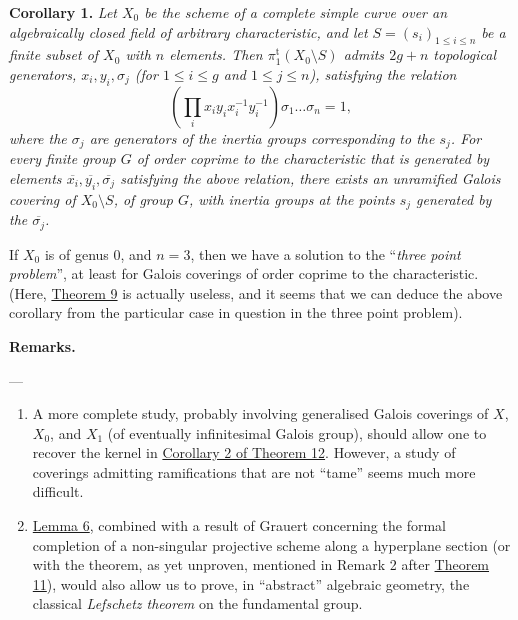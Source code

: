 \documentclass{article}
\newenvironment{itenv}[1]
  {\phantomsection\par\smallskip\noindent\textbf{#1.}\itshape}
  {\par\smallskip}
\newenvironment{rmenv}[1]
  {\phantomsection\par\smallskip\noindent\textbf{#1.}\rmfamily}
  {\par\smallskip}
\newcommand{\oldpage}[1]{\marginpar{\footnotesize$\Big\vert$ \textit{p.~#1}}}
\theoremstyle{definition}
\theoremstyle{definition}
\theoremstyle{definition}
\theoremstyle{definition}
\theoremstyle{remark}
\begin{document}
\leavevmode{}%
\begin{itenv}{Corollary 1}
Let \(X_0\) be the scheme of a complete simple curve over an algebraically closed field of arbitrary characteristic, and let \(S=(s_i)_{1\leqslant i\leqslant n}\) be a finite subset of \(X_0\) with \(n\) elements.
Then \(\pi_1^\mathrm{t}(X_0\setminus S)\) admits \(2g+n\) topological generators, \(x_i,y_i,\sigma_j\) (for \(1\leqslant i\leqslant g\) and \(1\leqslant j\leqslant n\)), satisfying the relation
\[
  \left(\prod_i x_iy_ix_i^{-1}y_i^{-1}\right)\sigma_1\ldots\sigma_n = 1,
\]
where the \(\sigma_j\) are generators of the inertia groups corresponding to the \(s_j\).
For every finite group \(G\) \emph{of order coprime to the characteristic} that is generated by elements \(\overline{x_i},\overline{y_i},\overline{\sigma_j}\) satisfying the above relation, there exists an unramified Galois covering of \(X_0\setminus S\), of group \(G\), with inertia groups at the points \(s_j\) generated by the \(\overline{\sigma_j}\).

\end{itenv}

If \(X_0\) is of genus \(0\), and \(n=3\), then we have a solution to the ``\emph{three point problem}'', at least for Galois coverings of order coprime to the characteristic.
\oldpage{182-28}(Here, \protect\hyperlink{fga-2-theorem-9}{Theorem 9} is actually useless, and it seems that we can deduce the above corollary from the particular case in question in the three point problem).

\begin{rmenv}{Remarks}

---

\begin{enumerate}
\def\labelenumi{\arabic{enumi}.}
\item
  A more complete study, probably involving generalised Galois coverings of \(X\), \(X_0\), and \(X_1\) (of eventually infinitesimal Galois group), should allow one to recover the kernel in \protect\hyperlink{fga-2-theorem-12-corollary-2}{Corollary 2 of Theorem 12}.
  However, a study of coverings admitting ramifications that are not ``tame'' seems much more difficult.
\item
  \protect\hyperlink{fga-2-lemma-6}{Lemma 6}, combined with a result of Grauert concerning the formal completion of a non-singular projective scheme along a hyperplane section (or with the theorem, as yet unproven, mentioned in Remark 2 after \protect\hyperlink{fga-2-theorem-11}{Theorem 11}), would also allow us to prove, in ``abstract'' algebraic geometry, the classical \emph{Lefschetz theorem} on the fundamental group.
\end{enumerate}

\end{rmenv}
\end{document}
